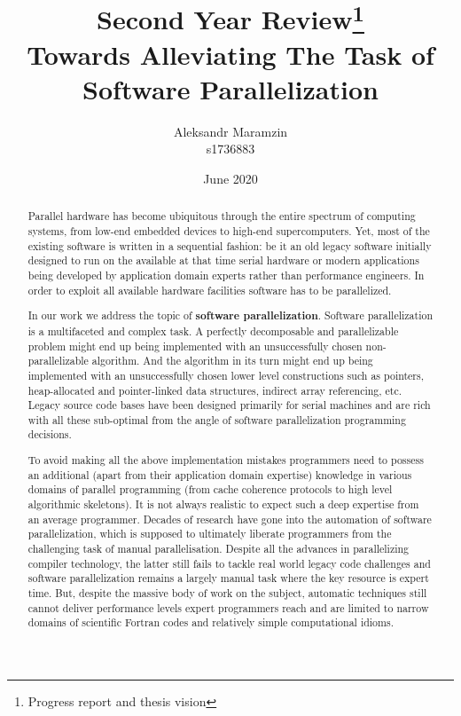 \documentclass[10pt,a4paper]{report}
\title{\centering \textbf{Second Year Review\thanks{Progress report and thesis vision}}\\Towards Alleviating The Task of Software Parallelization}
\author{Aleksandr Maramzin\\s1736883}
\date{June 2020}
\begin{document}
\maketitle

\begin{abstract}


\quad Parallel hardware has become ubiquitous through the entire spectrum of computing systems, from low-end embedded devices to high-end supercomputers. Yet, most of the existing software is written in a sequential fashion: be it an old legacy software initially designed to run on the available at that time serial hardware or modern applications being developed by application domain experts rather than performance engineers. In order to exploit all available hardware facilities software has to be parallelized.


\quad In our work we address the topic of \textbf{software parallelization}. Software parallelization is a multifaceted and complex task. A perfectly decomposable and parallelizable problem might end up being implemented with an unsuccessfully chosen non-parallelizable algorithm. And the algorithm in its turn might end up being implemented with an unsuccessfully chosen lower level constructions such as pointers, heap-allocated and pointer-linked data structures, indirect array referencing, etc. Legacy source code bases have been designed primarily for serial machines and are rich with all these sub-optimal from the angle of software parallelization programming decisions.


\quad To avoid making all the above implementation mistakes programmers need to possess an additional (apart from their application domain expertise) knowledge in various domains of parallel programming (from cache coherence protocols to high level algorithmic skeletons). It is not always realistic to expect such a deep expertise from an average programmer. Decades of research have gone into the automation of software parallelization, which is supposed to ultimately liberate programmers from the challenging task of manual parallelisation. Despite all the advances in parallelizing compiler technology, the latter still fails to tackle real world legacy code challenges and software parallelization remains a largely manual task where the key resource is expert time. But, despite the massive body of work on the subject, automatic techniques still cannot deliver performance levels expert programmers reach and are limited to narrow domains of scientific Fortran codes and relatively simple computational idioms.


\end{abstract}
\end{document}
